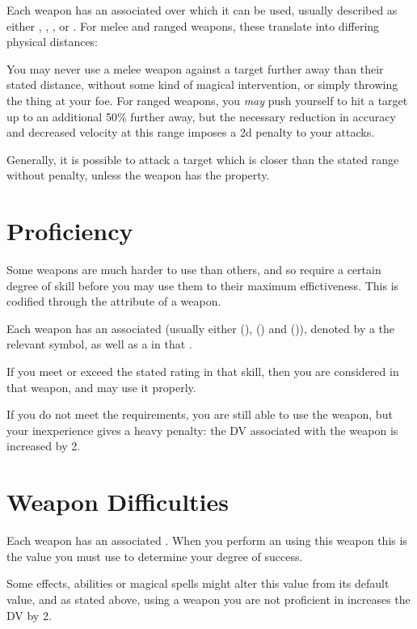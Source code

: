Each weapon has an associated  over which it can be used, usually described as either , , ,  or . For melee and ranged weapons, these translate into differing physical distances:

\rangetable{}

You may never use a melee weapon against a target further away than their stated distance, without some kind of magical intervention, or simply throwing the thing at your foe. For ranged weapons, you {\it may} push yourself to hit a target up to an additional 50\% further away, but the necessary reduction in accuracy and decreased velocity at this range imposes a 2d penalty to your attacks. 

Generally, it is possible to attack a target which is closer than the stated range without penalty, unless the weapon has the  property.
\section{Proficiency}

Some weapons are much harder to use than others, and so require a certain degree of skill before you may use them to their maximum effictiveness. This is codified through the  attribute of a weapon. 

Each weapon has an associated  (usually either  (\brawl),  (\skirmish) and  (\marksman)), denoted by a the relevant symbol, as well as a  in that . 

If you meet or exceed the stated rating in that skill, then you are considered  in that weapon, and may use it properly. 

If you do not meet the requirements, you are still able to use the weapon, but your inexperience gives a heavy penalty: the DV associated with the weapon is increased by 2. 


\section{Weapon Difficulties}

Each weapon has an associated . When you perform an  using this weapon this is the value you must use to determine your degree of success. 

Some effects, abilities or magical spells might alter this value from its default value, and as stated above, using a weapon you are not proficient in increases the DV by 2. 

